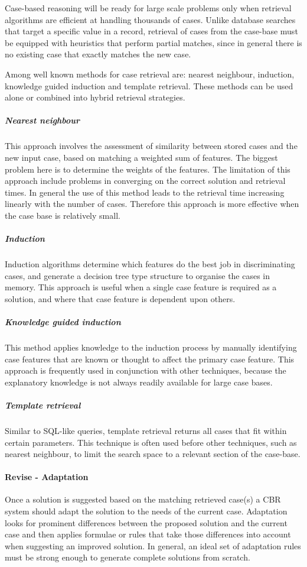 Case-based reasoning will be ready for large scale problems only when retrieval algorithms
are efficient at handling thousands of cases. Unlike database searches that target a specific
 value in a record, retrieval of cases from the case-base must be equipped with heuristics 
that perform partial matches, since in general there is no existing case that exactly matches the new case.

Among well known methods for case retrieval are: nearest neighbour, induction, 
knowledge guided induction and template retrieval. These methods can be used 
alone or combined into hybrid retrieval strategies.

\subparagraph{Nearest neighbour}
\label{nearest neighbour}This approach involves the assessment of similarity 
between stored cases and the new input case, based on matching a weighted sum 
of features. The biggest problem here is to determine the weights of the features. 
The limitation of this approach include problems in converging on the 
correct solution and retrieval times. In general the use of this method leads 
to the retrieval time increasing linearly with the number of cases. Therefore 
this approach is more effective when the case base is relatively small. 

\subparagraph{Induction}
\label{Induction}Induction algorithms determine which features do the best job 
in discriminating cases, and generate a decision tree type structure to organise 
the cases in memory. This approach is useful when a single case feature is 
required as a solution, and where that case feature is dependent upon others.

\subparagraph{Knowledge guided induction}
\label{Knowledge guided induction} This method applies knowledge to the induction 
process by manually identifying case features that are known or thought to affect 
the primary case feature. This approach is frequently used in conjunction with other 
techniques, because the explanatory knowledge is not always readily available for large case bases.


\subparagraph{Template retrieval}
\label{template} Similar to SQL-like queries, template retrieval returns all 
cases that fit within certain parameters. This technique is often used before 
other techniques, such as nearest neighbour, to limit the search space to a 
relevant section of the case-base.

\paragraph{Revise - Adaptation}
\label{Revise} Once a solution is suggested based on the matching retrieved case(s) 
a CBR system should adapt the solution to the needs of the current case. Adaptation 
looks for prominent differences between the proposed solution and the current case and 
then applies formulae or rules that take those differences into account when 
suggesting an improved solution. In general, an ideal set of adaptation rules must be strong 
enough to generate complete solutions from scratch.

